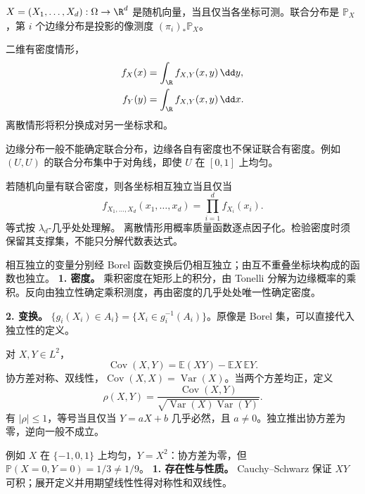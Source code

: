 $X=(X_1,\ldots,X_d):\Omega\to\R^d$ 是随机向量，当且仅当各坐标可测。联合分布是 $\mathbb P_X$，第 $i$ 个边缘分布是投影的像测度 $(\pi_i)_*\mathbb P_X$。

二维有密度情形，
\[
\begin{aligned}
f_X(x)&=\int_{\R}f_{X,Y}(x,y)\,\dd y,\\
f_Y(y)&=\int_{\R}f_{X,Y}(x,y)\,\dd x.
\end{aligned}
\]
离散情形将积分换成对另一坐标求和。

边缘分布一般不能确定联合分布，边缘各自有密度也不保证联合有密度。例如 $(U,U)$ 的联合分布集中于对角线，即使 $U$ 在 $[0,1]$ 上均匀。

若随机向量有联合密度，则各坐标相互独立当且仅当
\[
f_{X_1,\ldots,X_d}(x_1,\ldots,x_d)
=\prod_{i=1}^d f_{X_i}(x_i)
.
\]
等式按 $\lambda_d$-几乎处处理解。
离散情形用概率质量函数逐点因子化。检验密度时须保留其支撑集，不能只分解代数表达式。

相互独立的变量分别经 Borel 函数变换后仍相互独立；由互不重叠坐标块构成的函数也独立。
\textbf{1. 密度。} 乘积密度在矩形上的积分，由 Tonelli 分解为边缘概率的乘积。反向由独立性确定乘积测度，再由密度的几乎处处唯一性确定密度。

\textbf{2. 变换。} $\{g_i(X_i)\in A_i\}=\{X_i\in g_i^{-1}(A_i)\}$。原像是 Borel 集，可以直接代入独立性的定义。

对 $X,Y\in L^2$，
\[
\operatorname{Cov}(X,Y)=\mathbb E(XY)-\mathbb EX\,\mathbb EY.
\]
协方差对称、双线性，$\operatorname{Cov}(X,X)=\operatorname{Var}(X)$。当两个方差均正，定义
\[
\rho(X,Y)=\frac{\operatorname{Cov}(X,Y)}
{\sqrt{\operatorname{Var}(X)\operatorname{Var}(Y)}}.
\]
有 $|\rho|\le1$，等号当且仅当 $Y=aX+b$ 几乎必然，且 $a\ne0$。独立推出协方差为零，逆向一般不成立。

例如 $X$ 在 $\{-1,0,1\}$ 上均匀，$Y=X^2$：协方差为零，但 $\mathbb P(X=0,Y=0)=1/3\ne1/9$。
\textbf{1. 存在性与性质。} Cauchy--Schwarz 保证 $XY$ 可积；展开定义并用期望线性性得对称性和双线性。

